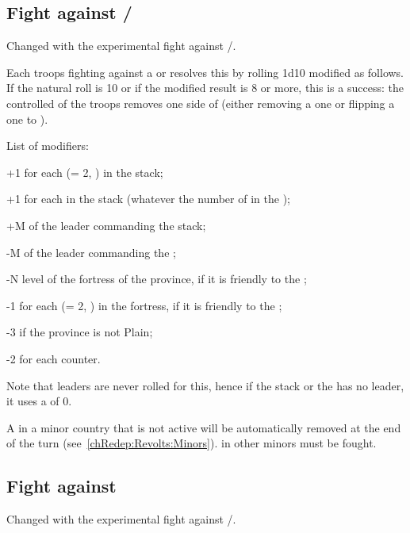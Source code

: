 \subsection{Fight against \REVOLT/\REBELLION}
\begin{designnote}
  Changed with the experimental fight against \RevReb/\corsaire.
\end{designnote}

Each troops fighting against a \REVOLT or \REBELLION resolves this by rolling
1d10 modified as follows. If the natural roll is 10 or if the modified result
is 8 or more, this is a success: the controlled of the troops removes one side
of \RevReb (either removing a \Facemoins one or flipping a \Faceplus one to
\Facemoins).

List of modifiers:
\begin{modlist}
\item[+1] for each \LD (\ARMY\facemoins = 2\LD, \ARMY{}\LD) in the
  stack;
\item[+1] for each \Pasha in the stack (whatever the number of \LD in the
  \Pasha);
\item[+M] \Man of the leader commanding the stack;
\item[-M] \Man of the leader commanding the \RevReb;
\item[-N] level of the fortress of the province, if it is friendly to the
  \RevReb;
\item[-1] for each \LD (\ARMY\facemoins = 2\LD, \ARMY{}\LD) in the
  fortress, if it is friendly to the \RevReb;
\item[-3] if the province is not Plain;
\item[-2] for each \RevReb\faceplus counter.
\end{modlist}

Note that  leaders are never rolled for this, hence if the
stack or the \RevReb has no leader, it uses a \Man of 0.

A \RevReb in a minor country that is not active will be automatically removed
at the end of the turn (see~\ref{chRedep:Revolts:Minors}). \RevReb in other
minors must be fought.

\subsection{Fight against \corsaire}
\label{chMilitary:Corsairs}
\begin{designnote}
  Changed with the experimental fight against \RevReb/\corsaire.
\end{designnote}

